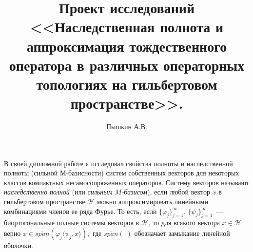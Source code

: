 \documentclass[a4paper,12pt]{article}
\newcommand{\cspan}[1]{\overline{span}\left(#1\right)}
\renewcommand{\phi}{\varphi}
\numberwithin{prop_under_lemma}{lemma}
\begin{document}
\title{Проект исследований <<Наследственная полнота и аппроксимация тождественного оператора в 
  различных операторных топологиях на гильбертовом пространстве>>.}
\author{Пышкин А.В.}
\date{}
\maketitle

В своей дипломной работе я исследовал свойства полноты и наследственной полноты
(сильной М-базисности) систем собственных векторов для некоторых классов компактных
несамосопряженных операторов. Систему векторов называют {\it наследственно полной} (или {\it сильным $M$-базисом}), если
любой вектор $x$ в гильбертовом пространстве $\mathcal{H}$ можно аппроксимировать
линейными комбинациями членов ее ряда Фурье. То есть, если $\{\phi_j\}_{j=1}^\infty$, $\{\psi_j\}_{j=1}^\infty$~---
биортогональные полные системы векторов в $\mathcal{H}$, то для всякого вектора $x \in \mathcal{H}$ верно
$x \in \cspan{\phi_j \langle\psi_j, x\rangle},$
где $\cspan{\cdot}$ обозначает замыкание линейной оболочки.
\end{document}
